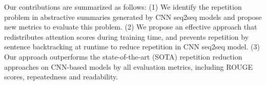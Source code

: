 
Our contributions are summarized as follows:
(1) We identify the repetition problem in abstractive summaries generated
by CNN seq2seq models and propose new metrics to evaluate this problem.
(2) We propose an effective approach that redistributes attention scores 
during training time, and prevents repetition by sentence backtracking
at runtime to reduce repetition in CNN seq2seq model.
(3) Our approach
outperforms the state-of-the-art (SOTA) repetition reduction approaches on CNN-based models
by all evaluation metrics, including ROUGE scores, 
repeatedness and readability.

